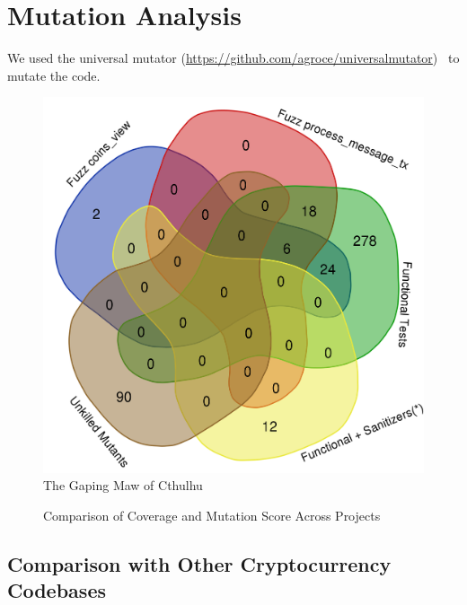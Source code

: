\section{Mutation Analysis}

\begin{sloppypar}
We used the universal mutator
(\url{https://github.com/agroce/universalmutator})~\cite{regexpMut} to
mutate the code.
\end{sloppypar}

\begin{figure}
\vspace{2mm}
\includegraphics[width=1.9\columnwidth]{kill_pre_valgrind.png}
\caption{The Gaping Maw of Cthulhu}
\end{figure}

\begin{figure}
\vspace{2mm}

\caption{Comparison of Coverage and Mutation Score Across Projects}
\label{fig:comparison}
\end{figure}

\subsection{Comparison with Other Cryptocurrency Codebases}

